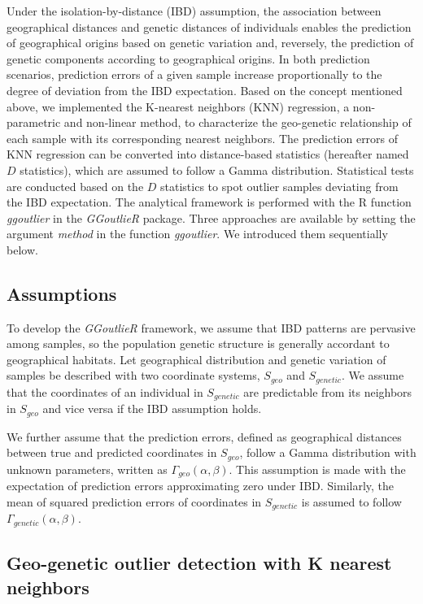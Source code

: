 \documentclass[11pt]{article}
\begin{document}
Under the isolation-by-distance (IBD) assumption, the association between geographical distances and genetic distances of individuals enables the prediction of geographical origins based on genetic variation and, reversely, the prediction of genetic components according to geographical origins.
In both prediction scenarios, prediction errors of a given sample increase proportionally to the degree of deviation from the IBD expectation.
Based on the concept mentioned above, we implemented the K-nearest neighbors (KNN) regression, a non-parametric and non-linear method, to characterize the geo-genetic relationship of each sample with its corresponding nearest neighbors.
The prediction errors of KNN regression can be converted into distance-based statistics (hereafter named $D$ statistics), which are assumed to follow a Gamma distribution.
Statistical tests are conducted based on the $D$ statistics to spot outlier samples deviating from the IBD expectation.
The analytical framework is performed with the R function \textit{ggoutlier} in the \textit{GGoutlieR} package.
Three approaches are available by setting the argument \textit{method} in the function \textit{ggoutlier}.
We introduced them sequentially below.

\subsection*{Assumptions}

To develop the \textit{GGoutlieR} framework, we assume that IBD patterns are pervasive among samples, so the population genetic structure is generally accordant to geographical habitats.
Let geographical distribution and genetic variation of samples be described with two coordinate systems, $S_{geo}$ and $S_{genetic}$.
We assume that the coordinates of an individual in $S_{genetic}$ are predictable from its neighbors in $S_{geo}$ and vice versa if the IBD assumption holds.

We further assume that the prediction errors, defined as geographical distances between true and predicted coordinates in $S_{geo}$, follow a Gamma distribution with unknown parameters, written as $\Gamma_{geo}(\alpha,\beta)$.
This assumption is made with the expectation of prediction errors approximating zero under IBD.
Similarly, the mean of squared prediction errors of coordinates in $S_{genetic}$ is assumed to follow $\Gamma_{genetic}(\alpha,\beta)$.

\subsection*{Geo-genetic outlier detection with K nearest neighbors}
\end{document}
